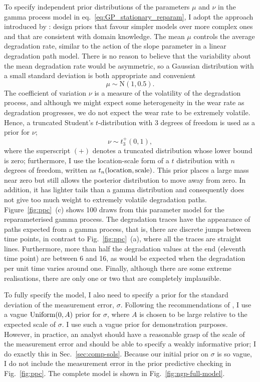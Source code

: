 To specify independent prior distributions of the parameters $\mu$ and $\nu$ in the gamma process model in eq.~\eqref{eq:GP_stationary_reparam}, I adopt the approach introduced by \cite{Simpson_2017}: design priors that favour simpler models over more complex ones and that are consistent with domain knowledge. The mean $\mu$ controls the average degradation rate, similar to the action of the slope parameter in a linear degradation path model. There is no reason to believe that the variability about the mean degradation rate would be asymmetric, so a Gaussian distribution with a small standard deviation is both appropriate and convenient
\begin{equation*}
  \mu \sim \mbox{N}(1, 0.5).
\end{equation*}
The coefficient of variation $\nu$ is a measure of the volatility of the degradation process, and although we might expect some heterogeneity in the wear rate as degradation progresses, we do not expect the wear rate to be extremely volatile. Hence, a truncated Student's $t$-distribution with 3 degrees of freedom is used as a prior for $\nu$;
\begin{equation*}
  \nu \sim t_3^{+}(0, 1),
\end{equation*}
where the superscript $(+)$ denotes a truncated distribution whose lower bound is zero; furthermore, I use the location-scale form of a $t$ distribution with $n$ degrees of freedom, written as $t_n(\hbox{location}, \hbox{scale})$. This prior places a large mass near zero but still allows the posterior distribution to move away from zero. In addition, it has lighter tails than a gamma distribution and consequently does not give too much weight to extremely volatile degradation paths. Figure~\ref{fig:ppc}~(c) shows 100 draws from this parameter model for the reparameterised gamma process. The degradation traces have the appearance of paths expected from a gamma process, that is, there are discrete jumps between time points, in contrast to Fig.~\ref{fig:ppc}~(a), where all the traces are straight lines. Furthermore, more than half the degradation values at the end (eleventh time point) are between 6 and 16, as would be expected when the degradation per unit time varies around one. Finally, although there are some extreme realisations, there are only one or two that are completely implausible.

To fully specify the model, I also need to specify a prior for the standard deviation of the measurement error, $\sigma$. Following the recommendations of \citet[Chap.~17]{gelman_workflow_2020}, I use a vague $\hbox{Uniform}(0, A)$ prior for $\sigma$, where $A$ is chosen to be large relative to the expected scale of $\sigma$. I use such a vague prior for demonstration purposes. However, in practice, an analyst should have a reasonable grasp of the scale of the measurement error and should be able to specify a weakly informative prior; I do exactly this in Sec.~\ref{sec:comp-sols}. Because our initial prior on $\sigma$ is so vague, I do not include the measurement error in the prior predictive checking in Fig.~\ref{fig:ppc}. The complete model is shown in Fig.~\ref{fig:ngp-full-model}.

